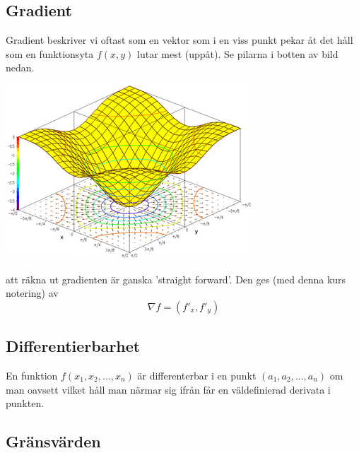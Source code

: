 \documentclass[10pt,a4paper]{article}
\begin{document}
\subsection{Gradient}
Gradient beskriver vi oftast som en vektor som i en viss punkt pekar åt det håll som en funktionsyta $f(x,y)$ lutar mest (uppåt). Se pilarna i botten av bild nedan.
\begin{center}
\includegraphics[scale=0.5]{gradient}
\end{center}
att räkna ut gradienten är ganska 'straight forward'. Den ges (med denna kurs notering) av
\begin{equation}
\nabla f = (f'_x,f'_y)
\end{equation}

\subsection{Differentierbarhet}
En funktion $f(x_1,x_2,...,x_n)$ är differenterbar i en punkt $(a_1,a_2,...,a_n)$ om man oavsett vilket håll man närmar sig ifrån får en väldefinierad derivata i punkten.

\subsection{Gränsvärden}
\end{document}
